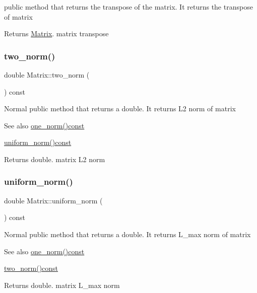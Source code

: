 public method that returns the transpose of the matrix. It returns the transpose of matrix \begin{DoxyReturn}{Returns}
\mbox{\hyperlink{class_matrix}{Matrix}}. matrix transpose 
\end{DoxyReturn}
\mbox{\label{class_matrix_aac496af05ec7aa26afc2b9c6d0ab8b66}} 
\subsubsection{\texorpdfstring{two\+\_\+norm()}{two\_norm()}}
{\footnotesize\ttfamily double Matrix\+::two\+\_\+norm (\begin{DoxyParamCaption}{ }\end{DoxyParamCaption}) const}

Normal public method that returns a double. It returns L2 norm of matrix \begin{DoxySeeAlso}{See also}
\mbox{\hyperlink{class_matrix_af4d468252f3ecbbcaa5726c76e332b4c}{one\+\_\+norm()const}} 

\mbox{\hyperlink{class_matrix_a43066c7fe6418aad40170b85415063e8}{uniform\+\_\+norm()const}} 
\end{DoxySeeAlso}
\begin{DoxyReturn}{Returns}
double. matrix L2 norm 
\end{DoxyReturn}
\mbox{\label{class_matrix_a43066c7fe6418aad40170b85415063e8}} 
\subsubsection{\texorpdfstring{uniform\+\_\+norm()}{uniform\_norm()}}
{\footnotesize\ttfamily double Matrix\+::uniform\+\_\+norm (\begin{DoxyParamCaption}{ }\end{DoxyParamCaption}) const}

Normal public method that returns a double. It returns L\+\_\+max norm of matrix \begin{DoxySeeAlso}{See also}
\mbox{\hyperlink{class_matrix_af4d468252f3ecbbcaa5726c76e332b4c}{one\+\_\+norm()const}} 

\mbox{\hyperlink{class_matrix_aac496af05ec7aa26afc2b9c6d0ab8b66}{two\+\_\+norm()const}} 
\end{DoxySeeAlso}
\begin{DoxyReturn}{Returns}
double. matrix L\+\_\+max norm 
\end{DoxyReturn}


